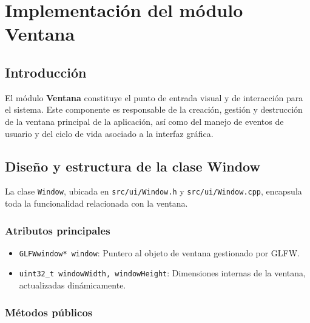 \chapter{Implementación del módulo Ventana}

\section{Introducción}

El módulo \textbf{Ventana} constituye el punto de entrada visual y de
interacción para el sistema. Este componente es responsable de la
creación, gestión y destrucción de la ventana principal de la aplicación, así
como del manejo de eventos de usuario y del ciclo de vida asociado a la
interfaz gráfica.

\section{Diseño y estructura de la clase Window}

La clase \texttt{Window}, ubicada en \texttt{src/ui/Window.h} y
\texttt{src/ui/Window.cpp}, encapsula toda la funcionalidad relacionada con la
ventana.

\subsection{Atributos principales}

\begin{itemize}
    \item \texttt{GLFWwindow* window}: Puntero al objeto de ventana gestionado por GLFW.
    \item \texttt{uint32\_t windowWidth, windowHeight}: Dimensiones internas de la ventana, actualizadas dinámicamente.
\end{itemize}

\subsection{Métodos públicos}

